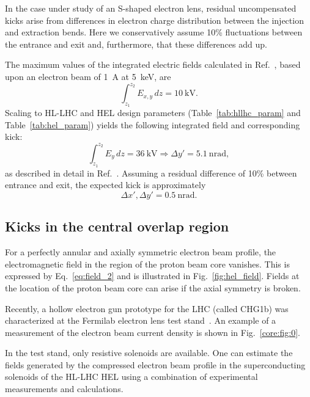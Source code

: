 \documentclass[%
 reprint,
 amsmath,amssymb,
 aps,
prstab,
longbibliography
]{revtex4-1}
\newcommand{\q}[2]{\ensuremath{#1\ \mathrm{#2}}} %
\begin{document}
In the case under study of an S-shaped electron lens, residual
uncompensated kicks arise from differences in electron charge
distribution between the injection and extraction bends. Here we
conservatively assume 10\% fluctuations between the entrance and exit
and, furthermore, that these differences add up.

The maximum values of the integrated electric fields calculated in
Ref.~\cite{hel_bends_stancari}, based upon an electron beam of 1~A at
5~keV, are
%
\begin{equation}
  \int_{z_1}^{z_2} E_{x,y} \, dz= \q{10}{kV}.
\end{equation}
%
Scaling to HL-LHC and HEL design parameters
(Table~\ref{tab:hllhc_param} and Table~\ref{tab:hel_param}) yields the
following integrated field and corresponding kick:
%
\begin{equation}
  \int_{z_1}^{z_2} E_{y} \, dz = \q{36}{kV} \Rightarrow \Delta y' = \q{5.1}{nrad},
\end{equation}
%
as described in detail in
Ref.~\cite{md_sim_hel_res_ex_fitterer}. Assuming a residual difference
of 10\% between entrance and exit, the expected kick is approximately
%
\begin{equation}
  \label{eqn:kick_bends}
  \Delta x', \Delta y' = \q{0.5}{nrad}.
\end{equation}


\subsection{Kicks in the central overlap region}
\label{core:sec:2}

For a perfectly annular and axially symmetric electron beam profile,
the electromagnetic field in the region of the proton beam core
vanishes. This is expressed by Eq.~\ref{eq:field_2} and is illustrated
in Fig.~\ref{fig:hel_field}. Fields at the location of the proton beam
core can arise if the axial symmetry is broken.

Recently, a hollow electron gun prototype for the LHC (called CHG1b)
was characterized at the Fermilab electron lens test
stand~\cite{hel_test_stand_fnal}. An example of a measurement of the
electron beam current density is shown in Fig.~\ref{core:fig:0}.

In the test stand, only resistive solenoids are available. One can
estimate the fields generated by the compressed electron beam profile
in the superconducting solenoids of the HL-LHC HEL using a combination
of experimental measurements and calculations.
\end{document}
